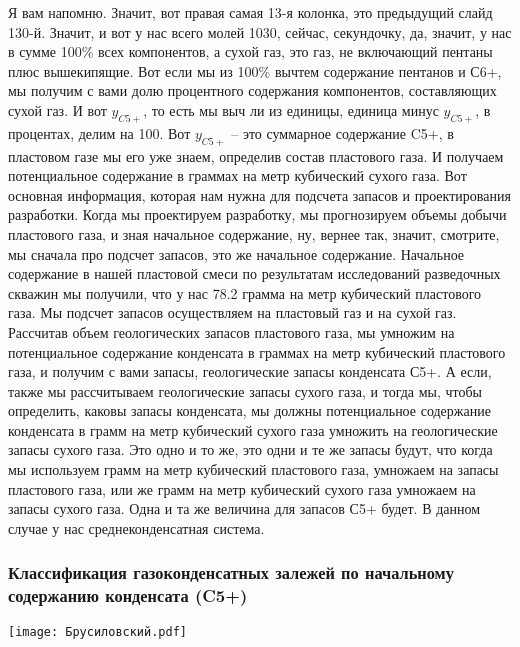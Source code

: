 \documentclass[main.tex]{subfiles}
\begin{document}
Я вам напомню.
Значит, вот правая самая 13-я колонка, это предыдущий слайд 130-й.
Значит, и вот у нас всего молей 1030, сейчас, секундочку, да, значит, у нас в сумме 100\% всех компонентов, а сухой газ, это газ, не включающий пентаны плюс вышекипящие.
Вот если мы из 100\% вычтем содержание пентанов и С6+, мы получим с вами долю процентного содержания компонентов, составляющих сухой газ.
И вот $y_{C5+}$, то есть мы выч ли из единицы, единица минус $y_{C5+}$, в процентах, делим на 100.
Вот $y_{C5+}$ -- это суммарное содержание C5+, в пластовом газе мы его уже знаем, определив состав пластового газа.
И получаем потенциальное содержание в граммах на метр кубический сухого газа.
Вот основная информация, которая нам нужна для подсчета запасов и проектирования разработки.
Когда мы проектируем разработку, мы прогнозируем объемы добычи пластового газа, и зная начальное содержание, ну, вернее так, значит, смотрите, мы сначала про подсчет запасов, это же начальное содержание.
Начальное содержание в нашей пластовой смеси по результатам исследований разведочных скважин мы получили, что у нас 78.2 грамма на метр кубический пластового газа.
Мы подсчет запасов осуществляем на пластовый газ и на сухой газ.
Рассчитав объем геологических запасов пластового газа, мы умножим на потенциальное содержание конденсата в граммах на метр кубический пластового газа, и получим с вами запасы, геологические запасы конденсата С5+.
А если, также мы рассчитываем геологические запасы сухого газа, и тогда мы, чтобы определить, каковы запасы конденсата, мы должны потенциальное содержание конденсата в грамм на метр кубический сухого газа умножить на геологические запасы сухого газа.
Это одно и то же, это одни и те же запасы будут, что когда мы используем грамм на метр кубический пластового газа, умножаем на запасы пластового газа, или же грамм на метр кубический сухого газа умножаем на запасы сухого газа.
Одна и та же величина для запасов С5+ будет.
В данном случае у нас среднеконденсатная система.

\subsubsection{Классификация газоконденсатных залежей по начальному содержанию конденсата (C5+)}

\begin{center}
\texttt{[image: Брусиловский.pdf]}
\end{center}
\end{document}
